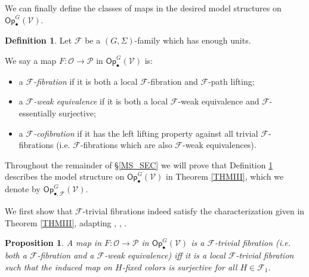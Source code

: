 \documentclass[a4paper,10pt
,draft
]{article}%
\numberwithin{equation}{section}
\numberwithin{figure}{section}
\newtheorem{proposition}[equation]{Proposition}%
\theoremstyle{definition} %
\newtheorem{definition}[equation]{Definition}%
\newcommand{\F}{\ensuremath{\mathcal F}}
\newcommand{\V}{\ensuremath{\mathcal V}}
\renewcommand{\O}{\ensuremath{\mathcal O}}
\renewcommand{\P}{\ensuremath{\mathcal P}}
\newcommand{\1}{\ensuremath{\mathbbm 1}}%
\begin{document}
We can finally define the classes of maps in the desired model structures on $\mathsf{Op}^G_\bullet(\V)$.



\begin{definition}\label{MODEL_DEFN}
Let $\F$ be a $(G, \Sigma)$-family which has enough units.

We say a map $F: \O \to \P$ in $\mathsf{Op}^G_\bullet(\V)$ is:
\begin{itemize}
	\item a {\em $\F$-fibration} if it is both a local $\F$-fibration and $\F$-path lifting;
	\item a {\em $\F$-weak equivalence} if it is both a local $\F$-weak equivalence and $\F$-essentially surjective;
	\item a \textit{$\F$-cofibration} if it has the left lifting property against all trivial $\F$-fibrations (i.e. $\F$-fibrations which are also $\F$-weak equivalences).
\end{itemize}
\end{definition}


Throughout the remainder of \S \ref{MS_SEC}
we will prove that 
Definition \ref{MODEL_DEFN} describes the model structure on 
$\mathsf{Op}^G_\bullet(\V)$
in Theorem \ref{THMIII},
which we denote by
$\mathsf{Op}^G_{\bullet, \F}(\V)$.



We first show that $\F$-trivial fibrations
indeed satisfy the characterization given in Theorem \ref{THMIII},
adapting \cite[4.8]{Cav}, \cite[2.3]{BM13}, \cite[1.18]{CM13b}.

\begin{proposition}\label{FTRIVCHAR PROP}
A map in $F: \O \to \P$ in $\mathsf{Op}^G_\bullet(\V)$ is 
a $\F$-trivial fibration (i.e. both a $\F$-fibration and a $\F$-weak equivalence) 
iff it is a local $\F$-trivial fibration
such that the induced map on $H$-fixed colors is surjective
for all $H \in \F_1$.
\end{proposition}
\end{document}
